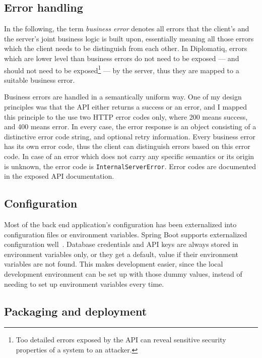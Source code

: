 \subsection{Error handling}

In the following, the term \emph{business error} denotes all errors that the client's and the server's joint business logic is built upon, essentially meaning all those errors which the client needs to be distinguish from each other. In Diplomatiq, errors which are lower level than business errors do not need to be exposed — and should not need to be exposed\footnote{Too detailed errors exposed by the API can reveal sensitive security properties of a system to an attacker.} — by the server, thus they are mapped to a suitable business error.

Business errors are handled in a semantically uniform way. One of my design principles was that the API either returns a success or an error, and I mapped this principle to the use two HTTP error codes only, where 200 means success, and 400 means error. In every case, the error response is an object consisting of a distinctive error code string, and optional retry information. Every business error has its own error code, thus the client can distinguish errors based on this error code. In case of an error which does not carry any specific semantics or its origin is unknown, the error code is \lstinline{InternalServerError}. Error codes are documented in the exposed API documentation.

\subsection{Configuration}

Most of the back end application's configuration has been externalized into configuration files or environment variables. Spring Boot supports externalized configuration well~\cite{spring-boot-reference-docs}. Database credentials and API keys are always stored in environment variables only, or they get a default,  value if their environment variables are not found. This makes development easier, since the local development environment can be set up with those dummy values, instead of needing to set up environment variables every time.

\subsection{Packaging and deployment}

